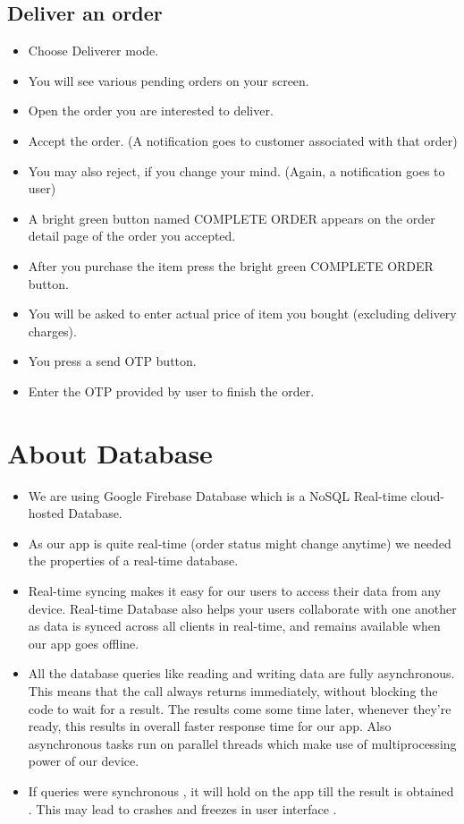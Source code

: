 \documentclass{report}
\begin{document}
\section{Deliver an order}
\begin{itemize}[label=$\rightarrow$]
\item Choose Deliverer mode.
\item You will see various pending orders on your screen.
\item Open the order you are interested to deliver.
\item Accept the order. (A notification goes to customer associated with that order)
\item You may also reject, if you change your mind. (Again, a notification goes to user)
\item A bright green button named COMPLETE ORDER appears on the order detail page of the order you accepted.
\item After you purchase the item press the bright green COMPLETE ORDER button.
\item You will be asked to enter actual price of item you bought (excluding delivery charges).
\item You press a send OTP button.
\item Enter the OTP provided by user to finish the order.

\end{itemize}

\chapter{About Database}

\begin{itemize}
\item We are using Google Firebase Database which is a NoSQL Real-time cloud-hosted Database.
\item As our app is quite real-time (order status might change anytime) we needed the properties of a real-time database.
\item Real-time syncing makes it easy for our users to access their data from any device. Real-time Database also helps your users collaborate with one another as data is synced across all clients in real-time, and remains available when our app goes offline.
\item All the database queries like reading and writing data are fully asynchronous. This means that the call always returns immediately, without blocking the code to wait for a result. The results come some time later, whenever they’re ready, this results in overall faster response time for our app. Also asynchronous tasks run on parallel threads which make use of multiprocessing power of our device.
\item If queries were synchronous , it will hold on the app till the result is obtained . This may lead to crashes and freezes in user interface .   
\end{itemize}
\end{document}
